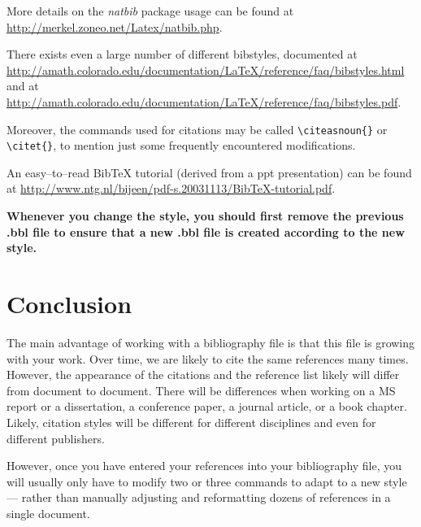 \documentclass[12pt]{article}
\begin{document}
More details on the {\it natbib} package usage can be found at
\url{http://merkel.zoneo.net/Latex/natbib.php}.

There exists even a large number of different bibstyles,
documented at \url{http://amath.colorado.edu/documentation/LaTeX/reference/faq/bibstyles.html}
and at
\url{http://amath.colorado.edu/documentation/LaTeX/reference/faq/bibstyles.pdf}.

Moreover, the commands used for citations may be called
\verb|\citeasnoun{}| or \verb|\citet{}|, to mention just some
frequently encountered modifications.

An easy--to--read BibTeX tutorial (derived from a ppt presentation) 
can be found at 
\url{http://www.ntg.nl/bijeen/pdf-s.20031113/BibTeX-tutorial.pdf}.

{\bf Whenever you change the style, you should first
remove the previous .bbl file to ensure that a new .bbl file
is created according to the new style.}


\section{Conclusion}

The main advantage of working with a bibliography file is that this
file is growing with your work. Over time, we are likely to cite
the same references many times. However, the appearance
of the citations and the reference list likely will differ from
document to document. There will be differences
when working on a MS report or a dissertation, a conference paper,
a journal article, or a book chapter. Likely, citation styles will be different
for different disciplines and even for different publishers.

However, once you have entered your references into your bibliography file,
you will usually only have to modify two or three commands
to adapt to a new style --- rather than manually adjusting
and reformatting dozens of references in a single document.




\end{document}

